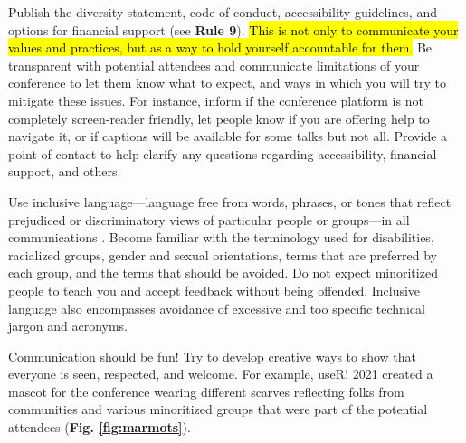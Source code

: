\documentclass[10pt,letterpaper]{article}
\begin{document}
Publish the diversity statement, code of conduct, accessibility guidelines, and options for financial support (see \textbf{Rule 9}).
\hl{This is not only to communicate your values and practices, but as a way to hold yourself accountable for them.}
Be transparent with potential attendees and communicate limitations of your conference to let them know what to expect, and ways in which you will try to mitigate these issues. 
For instance, inform if the conference platform is not completely screen-reader friendly, let people know if you are offering help to navigate it, or if captions will be available for some talks but not all.
Provide a point of contact to help clarify any questions regarding accessibility, financial support, and others.

Use inclusive language---language free from words, phrases, or tones that reflect prejudiced or discriminatory views of particular people or groups---in all communications \cite{hallDesigningDiversityInclusion2019}. 
Become familiar with the terminology used for disabilities, racialized groups, gender and sexual orientations, terms that are preferred by each group, and the terms that should be avoided.
Do not expect minoritized people to teach you and accept feedback without being offended.
Inclusive language also encompasses avoidance of excessive and too specific technical jargon and acronyms. 

Communication should be fun! Try to develop creative ways to show that everyone is seen, respected, and welcome. 
For example, useR! 2021 created a mascot for the conference wearing different scarves reflecting folks from communities and various minoritized groups that were part of the potential attendees (\textbf{Fig. \ref{fig:marmots}}). 
\end{document}
